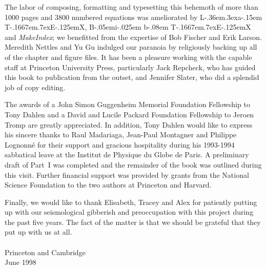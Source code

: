 The labor of composing, formatting and typesetting this behemoth
of more than 1000 pages and 3800
numbered equations was ameliorated by
{L\kern-.36em\raise.3ex\hbox{\sc a}\kern-.15em
T\kern-.1667em\lower.7ex\hbox{E}\kern-.125emX},
{B\kern-.05em{\sc i\kern-.025em b}\kern-.08em
T\kern-.1667em\lower.7ex\hbox{E}\kern-.125emX}
and {\em MakeIndex\/}; we benefitted from the
expertise of Bob Fischer and Erik Larson.
Meredith Nettles and Yu Gu indulged our paranoia by religiously
backing up all of the chapter and figure files.  It has been a pleasure working
with the capable staff at Princeton University Press,
particularly Jack Repcheck, who has guided this book
to publication from the outset, and Jennifer Slater,
who did a splendid job of copy editing.

The awards of a John Simon Guggenheim Memorial Foundation
Fellowship to Tony Dahlen and a David and Lucile Packard
Foundation Fellowship to Jeroen Tromp are greatly appreciated.
In addition, Tony Dahlen would like to express his sincere thanks
to Raul Madariaga, Jean-Paul Montagner and Philippe Lognonn\'{e}
for their support and gracious hospitality during his
1993-1994 sabbatical leave at the Institut de Physique du Globe
de Paris.  A preliminary draft of Part~I was completed and
the remainder of the book was outlined during this visit.
Further financial support was provided by grants from the
National Science Foundation to the two authors at Princeton
and Harvard.

Finally, we would like to thank Elisabeth, Tracey and Alex for
patiently putting up with our seismological gibberish and preoccupation
with this project during the past five years.  The fact of the matter is
that we should be grateful that they put up with us at all.
\\ \\
Princeton and Cambridge
\\
June 1998

\thispagestyle{myheadings} 
